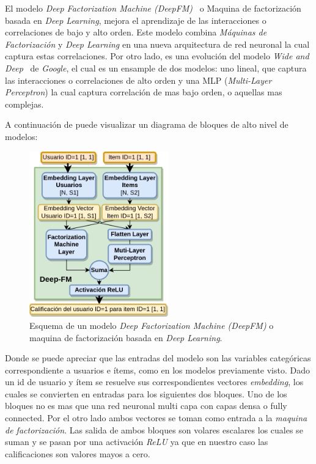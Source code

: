 \documentclass[11pt,a4paper,twoside]{thesis}
\begin{document}
El modelo \textit{Deep Factorization Machine (DeepFM)}~\cite{dfmpaper, didldfm}
o Maquina de factorización basada en \textit{Deep Learning}, mejora el
aprendizaje de las interacciones o correlaciones de bajo y alto orden. Este
modelo combina \textit{Máquinas de Factorización} y \textit{Deep Learning} en
una nueva arquitectura de red neuronal la cual captura estas correlaciones. Por
otro lado, es una evolución del modelo \textit{Wide and
	Deep}~\cite{wideanddeeppaper} de \textit{Google}, el cual es un ensample de dos
modelos: uno lineal, que captura las interacciones o correlaciones de alto
orden y una MLP (\textit{Multi-Layer Perceptron}) la cual captura correlación
de mas bajo orden, o aquellas mas complejas.

A continuación de puede visualizar un diagrama de bloques de alto nivel de
modelos:

\begin{figure}[h!]
	\centering
	\includegraphics[width=6cm]{./images/Deep-MF.png}
	\caption{
		Esquema de un modelo \textit{Deep Factorization Machine (DeepFM)} o maquina de factorización basada en \textit{Deep Learning}.
	}
	\label{fig:DeepMFModel}
\end{figure}

Donde se puede apreciar que las entradas del modelo son las variables
categóricas correspondiente a usuarios e ítems, como en los modelos previamente
visto. Dado un id de usuario y ítem se resuelve sus correspondientes vectores
\textit{embedding}, los cuales se convierten en entradas para los siguientes
dos bloques. Uno de los bloques no es mas que una red neuronal multi capa con
capas densa o fully connected. Por el otro lado ambos vectores se toman como
entrada a la \textit{maquina de factorización}. Las salida de ambos bloques son
volares escalares los cuales se suman y se pasan por una activación
\textit{ReLU} ya que en nuestro caso las calificaciones son valores mayos a
cero.
\end{document}
